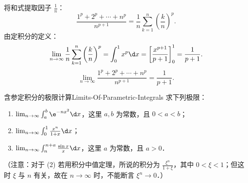 \begin{solution}

    将和式提取因子 $\frac{1}{n}$：
    \begin{equation}
        \frac{1^p + 2^p + \cdots + n^p}{n^{p+1}} = \frac{1}{n}\sum_{k=1}^n \left( \frac{k}{n} \right)^p.
    \end{equation}
    由定积分的定义：
    \begin{equation}
        \lim_{n\to\infty} \frac{1}{n}\sum_{k=1}^n \left( \frac{k}{n} \right)^p = \int_0^1 x^p \d x = \left[ \frac{x^{p+1}}{p+1} \right]_0^1 = \frac{1}{p+1}.
    \end{equation}
    \begin{equation}
        \boxed{\lim_{n\to\infty} \frac{1^p + 2^p + \cdots + n^p}{n^{p+1}} = \frac{1}{p+1}.}
    \end{equation}
\end{solution}

\begin{problem}{含参定积分的极限计算}{Limits-Of-Parametric-Integrals}
    求下列极限：
    \begin{enumerate}
        \item $\lim_{n\to\infty} \int_a^b \e^{-nx^2} \d x$，这里 $a, b$ 为常数，且 $0 < a < b$；
        \item $\lim_{n\to\infty} \int_0^1 \frac{x^n}{1 + x} \d x$；
        \item $\lim_{n\to\infty} \int_n^{n+a} \frac{\sin x}{x} \d x$，这里 $a$ 为常数，且 $a > 0$．
    \end{enumerate}
    （注意：对于 (2) 若用积分中值定理，所说的积分为 $\frac{\xi^n}{1+\xi}$，其中 $0 < \xi < 1$；但这时 $\xi$ 与 $n$ 有关，故在 $n\to\infty$ 时，不能断言 $\xi^n \to 0$．）
\end{problem}

